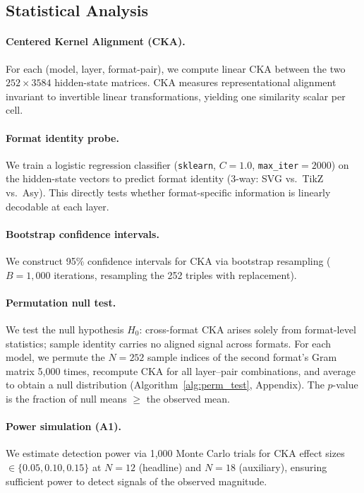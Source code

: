\subsection{Statistical Analysis}
\label{sec:analysis}

\paragraph{Centered Kernel Alignment (CKA).}
For each (model, layer, format-pair), we compute linear CKA \cite{kornblith2019similarity} between the two $252 \times 3584$ hidden-state matrices.
CKA measures representational alignment invariant to invertible linear transformations, yielding one similarity scalar per cell.

\paragraph{Format identity probe.}
We train a logistic regression classifier (\texttt{sklearn}, $C{=}1.0$, \texttt{max\_iter}${=}2000$) on the hidden-state vectors to predict format identity (3-way: SVG vs.\ TikZ vs.\ Asy).
This directly tests whether format-specific information is linearly decodable at each layer.

\paragraph{Bootstrap confidence intervals.}
We construct 95\% confidence intervals for CKA via bootstrap resampling ($B{=}1{,}000$ iterations, resampling the 252 triples with replacement).

\paragraph{Permutation null test.}
We test the null hypothesis $H_0$: cross-format CKA arises solely from format-level statistics; sample identity carries no aligned signal across formats.
For each model, we permute the $N{=}252$ sample indices of the second format's Gram matrix 5{,}000 times, recompute CKA for all layer--pair combinations, and average to obtain a null distribution (Algorithm~\ref{alg:perm_test}, Appendix).
The $p$-value is the fraction of null means $\geq$ the observed mean.

\paragraph{Power simulation (A1).}
We estimate detection power via 1{,}000 Monte Carlo trials for CKA effect sizes $\in \{0.05, 0.10, 0.15\}$ at $N{=}12$ (headline) and $N{=}18$ (auxiliary), ensuring sufficient power to detect signals of the observed magnitude.

